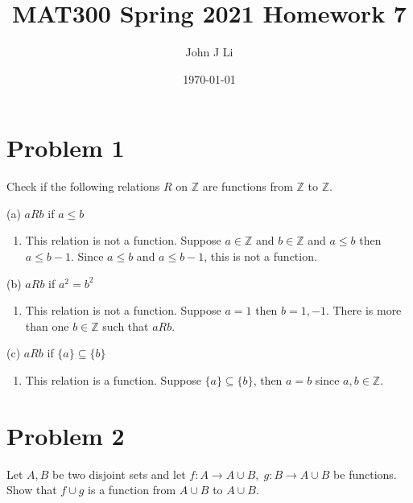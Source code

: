 \documentclass{article}
\title{MAT300 Spring 2021 Homework 7}
\date{\today}
\author{John J Li}
\begin{document}
    \maketitle
    \thispagestyle{empty}


    \section*{Problem 1}
    
    Check if the following relations $R$ on $\mathbb{Z}$ are functions from $\mathbb{Z}$ to $\mathbb{Z}$.

    (a) $aRb$ if $a\leq b$

    \begin{enumerate}[label=\quad\quad, leftmargin=*]
        \item 
        This relation is not a function. Suppose $a\in\mathbb{Z}$ and $b\in\mathbb{Z}$ and 
        $a\leq b$ then $a\leq b-1$. Since $a\leq b$ and $a\leq b-1$, this is not a function.
    \end{enumerate}

    (b) $aRb$ if $a^2 = b^2$

    \begin{enumerate}[label=\quad\quad, leftmargin=*]
        \item 
        This relation is not a function. Suppose $a=1$ then $b=1,-1$. There is more than 
        one $b\in\mathbb{Z}$ such that $aRb$.
    \end{enumerate}

    (c) $aRb$ if $\{a\} \subseteq \{b\}$

    \begin{enumerate}[label=\quad\quad, leftmargin=*]
        \item 
        This relation is a function. Suppose $\{a\} \subseteq \{b\}$, then $a=b$ since $a,b
        \in\mathbb{Z}$.
    \end{enumerate}



    \section*{Problem 2}

    Let $A,B$ be two disjoint sets and let $f : A \rightarrow A \cup B,\; g : B \rightarrow A \cup B$ be
    functions. Show that $f \cup g$ is a function from $A \cup B$ to $A \cup B$.
\end{document}
